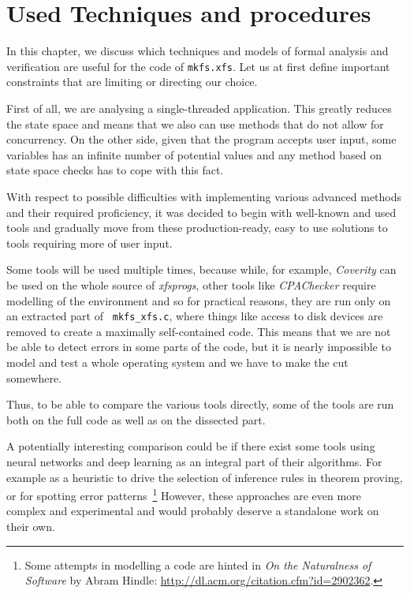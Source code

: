
\chapter{Used Techniques and procedures}\label{chap:techniques}

In this chapter, we discuss which techniques and models of formal analysis and verification are useful for the code of {\tt mkfs.xfs}. Let us at first define important constraints that are limiting or directing our choice.

First of all, we are analysing a single-threaded application. This greatly reduces the state space and means that we also can use methods that do not allow for concurrency. On the other side, given that the program accepts user input, some variables has an infinite number of potential values and any method based on state space checks has to cope with this fact.

With respect to possible difficulties with implementing various advanced
methods and their required proficiency, it was decided to begin with well-known
and used tools and gradually move from these production-ready, easy to use
solutions to tools requiring more of user input.

Some tools will be used multiple times, because while, for example, {\em
	Coverity} can be used on the whole source of {\em xfsprogs}, other
	tools like {\em CPAChecker} require modelling of the environment and so
	for practical reasons, they are run only on an extracted part of {\tt
		mkfs\_xfs.c}, where things like access to disk devices are
		removed to create a maximally self-contained code. This means
		that we are not be able to detect errors in some parts of the
		code, but it is nearly impossible to model and test a whole
		operating system and we have to make the cut somewhere.

Thus, to be able to compare the various tools directly, some of the tools are run both on the full code as well as on the dissected part.

A potentially interesting comparison could be if there exist some tools using neural networks and deep learning as an integral part of their algorithms. For example as a heuristic to drive the selection of inference rules in theorem proving, or for spotting error patterns~\footnote{Some attempts in modelling a code are hinted in {\em On the Naturalness of Software} by Abram Hindle: \url{http://dl.acm.org/citation.cfm?id=2902362}.} However, these approaches are even more complex and experimental and would probably deserve a standalone work on their own.

